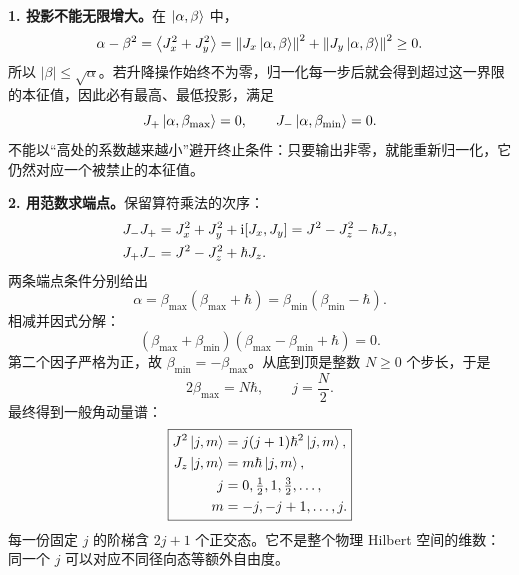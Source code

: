 \textbf{1. 投影不能无限增大。}在 $\left|\alpha,\beta\right\rangle$ 中，
\begin{equation}
  \alpha-\beta^2
  =\left\langle J_x^2+J_y^2 \right\rangle
  =\left\lVert J_x\left|\alpha,\beta\right\rangle \right\rVert^2
   +\left\lVert J_y\left|\alpha,\beta\right\rangle \right\rVert^2\geq0.
\end{equation}
所以 $|\beta|\leq\sqrt\alpha$。若升降操作始终不为零，归一化每一步后就会得到超过这一界限的本征值，因此必有最高、最低投影，满足
\begin{equation}
  J_+\left|\alpha,\beta_{\max}\right\rangle=0,
  \qquad J_-\left|\alpha,\beta_{\min}\right\rangle=0.
\end{equation}
不能以“高处的系数越来越小”避开终止条件：只要输出非零，就能重新归一化，它仍然对应一个被禁止的本征值。

\textbf{2. 用范数求端点。}保留算符乘法的次序：
\begin{align}
  J_-J_+&=J_x^2+J_y^2+\mathrm{i}[J_x,J_y]
     =J^2-J_z^2-\hbar J_z,\notag\\
  J_+J_-&=J^2-J_z^2+\hbar J_z.
  \label{eq:QM-C12-S05-ladder-products}
\end{align}
两条端点条件分别给出
\begin{equation}
  \alpha=\beta_{\max}(\beta_{\max}+\hbar)
        =\beta_{\min}(\beta_{\min}-\hbar).
\end{equation}
相减并因式分解：
\begin{equation}
  (\beta_{\max}+\beta_{\min})
  (\beta_{\max}-\beta_{\min}+\hbar)=0.
\end{equation}
第二个因子严格为正，故 $\beta_{\min}=-\beta_{\max}$。从底到顶是整数 $N\geq0$ 个步长，于是
\begin{equation}
  2\beta_{\max}=N\hbar,\qquad j=\frac N2.
\end{equation}
最终得到一般角动量谱：
\begin{equation}
  \boxed{\begin{aligned}
    J^2\left|j,m\right\rangle&=j(j+1)\hbar^2\left|j,m\right\rangle,\\
    J_z\left|j,m\right\rangle&=m\hbar\left|j,m\right\rangle,\\
    j&=0,\tfrac12,1,\tfrac32,\ldots,\\
    m&=-j,-j+1,\ldots,j.
  \end{aligned}}
  \label{eq:QM-C12-S05-spectrum}
\end{equation}
每一份固定 $j$ 的阶梯含 $2j+1$ 个正交态。它不是整个物理 Hilbert 空间的维数：同一个 $j$ 可以对应不同径向态等额外自由度。

